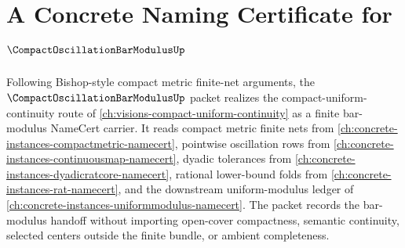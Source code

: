 \chapter{A Concrete Naming Certificate for $\CompactOscillationBarModulusUp$}
\label{ch:concrete-instances-compact-oscillation-bar-modulus-namecert}

Following Bishop-style compact metric finite-net arguments, the $\CompactOscillationBarModulusUp$ packet realizes the compact-uniform-continuity route of \autoref{ch:visions-compact-uniform-continuity} as a finite bar-modulus NameCert carrier. It reads compact metric finite nets from \autoref{ch:concrete-instances-compactmetric-namecert}, pointwise oscillation rows from \autoref{ch:concrete-instances-continuousmap-namecert}, dyadic tolerances from \autoref{ch:concrete-instances-dyadicratcore-namecert}, rational lower-bound folds from \autoref{ch:concrete-instances-rat-namecert}, and the downstream uniform-modulus ledger of \autoref{ch:concrete-instances-uniformmodulus-namecert}. The packet records the bar-modulus handoff without importing open-cover compactness, semantic continuity, selected centers outside the finite bundle, or ambient completeness.

